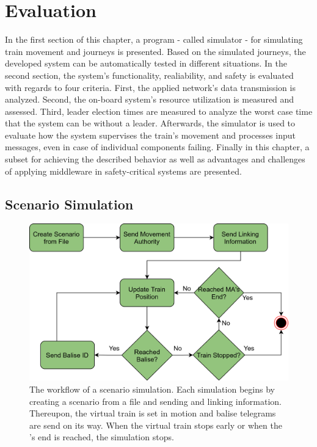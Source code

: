\chapter{Evaluation}
\label{cpt:evaluation}

In the first section of this chapter, a program - called simulator - for simulating train movement and journeys is presented.
Based on the simulated journeys, the developed system can be automatically tested in different situations.
In the second section, the system's functionality, realiability, and safety is evaluated with regards to four criteria.
First, the applied network's data transmission is analyzed.
Second, the on-board system's resource utilization is measured and assessed.
Third, leader election times are measured to analyze the worst case time that the system can be without a leader.
Afterwards, the simulator is used to evaluate how the system supervises the train's movement and processes input messages, even in case of individual components failing.
Finally in this chapter, a  subset for achieving the described behavior as well as advantages and challenges of applying  middleware in safety-critical systems are presented.


\section{Scenario Simulation}
\label{subsec:ScenarioSimulation}

\begin{figure}[!hb]
	\centering
	\includegraphics[width=0.8\linewidth]{images/SimulatorWorkflow}
	\caption{The workflow of a scenario simulation. Each simulation begins by creating a scenario from a file and sending  and linking information. Thereupon, the virtual train is set in motion and balise telegrams are send on its way. When the virtual train stops early or when the 's end is reached, the simulation stops.}
	\label{fig:SimulatorWorkflow}
\end{figure}

